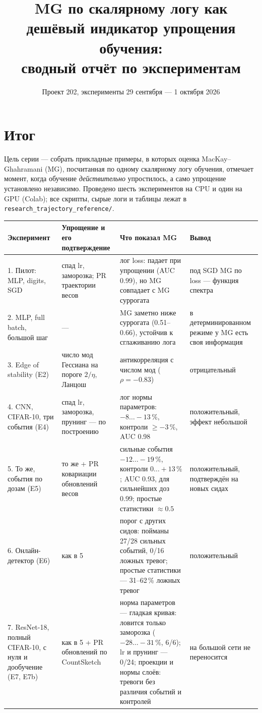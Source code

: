 \documentclass[10pt,a4paper]{article}
\title{MG по скалярному логу как дешёвый индикатор упрощения обучения:\\
сводный отчёт по экспериментам}
\author{Проект 202, эксперименты 29 сентября --- 1 октября 2026}
\date{}
\newcommand{\good}[1]{\textcolor[HTML]{117733}{#1}}
\newcommand{\bad}[1]{\textcolor[HTML]{BB5566}{#1}}
\begin{document}
\maketitle

\section*{Итог}

Цель серии --- собрать прикладные примеры, в которых оценка MacKay--Ghahramani (MG),
посчитанная по одному скалярному логу обучения, отмечает момент, когда обучение
\emph{действительно} упростилось, а само упрощение установлено независимо. Проведено
шесть экспериментов на CPU и один на GPU (Colab); все скрипты, сырые логи и таблицы лежат в
\texttt{research\_trajectory\_reference/}.

\begin{table}[h]
\centering\small
\begin{tabular}{@{}p{3.4cm}p{3.6cm}p{4.3cm}p{4.2cm}@{}}
\toprule
Эксперимент & Упрощение и его подтверждение & Что показал MG & Вывод \\
\midrule
1. Пилот: MLP, digits, SGD & спад lr, заморозка; PR траектории весов
  & лог loss: падает при упрощении (AUC 0.99), но MG совпадает с MG суррогата
  & \bad{под SGD MG по loss --- функция спектра} \\
2. MLP, full batch, большой шаг & --- & MG заметно ниже суррогата (0.51--0.66),
  устойчив к сглаживанию лога & в детерминированном режиме у MG есть своя информация \\
3. Edge of stability (E2) & число мод Гессиана на пороге $2/\eta$, Ланцош
  & \bad{антикорреляция} с числом мод ($\rho=-0.83$) & \bad{отрицательный} \\
4. CNN, CIFAR-10, три события (E4) & спад lr, заморозка, прунинг --- по построению
  & лог нормы параметров: $-8\ldots-13\,\%$, контроли $\geq -3\,\%$, AUC 0.98
  & \good{положительный, эффект небольшой} \\
5. То же, события по дозам (E5) & то же + PR ковариации обновлений весов
  & сильные события $-12\ldots-19\,\%$, контроли $0\ldots+13\,\%$; AUC 0.93, для
    сильнейших доз 0.99; простые статистики $\approx 0.5$
  & \good{положительный, подтверждён на новых сидах} \\
6. Онлайн-детектор (E6) & как в 5 & порог с других сидов: пойманы 27/28 сильных событий,
    0/16 ложных тревог; простые статистики --- 31--62\,\% ложных тревог
  & \good{положительный} \\
7. ResNet-18, полный CIFAR-10, с нуля и дообучение (E7, E7b) & как в 5 + PR обновлений по CountSketch
  & норма параметров --- гладкая кривая: ловится только заморозка ($-28\ldots-31\,\%$, 6/6);
    lr и прунинг --- 0/24; проекции и нормы слоёв: тревоги без различия событий и контролей
  & \bad{на большой сети не переносится} \\
\bottomrule
\end{tabular}
\end{table}
\end{document}

